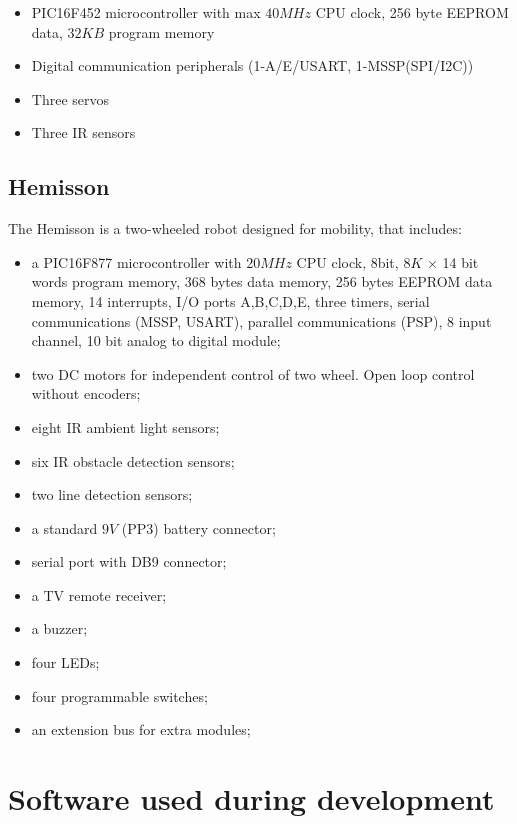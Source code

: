 \documentclass[a4paper,10pt]{article} %
\begin{document}
\begin{itemize}
    \item PIC16F452 microcontroller with max $40MHz$ CPU clock, 256 byte
    EEPROM data, $32KB$ program memory
    \item Digital communication peripherals (1-A/E/USART, 1-MSSP(SPI/I2C))
    \item Three servos
    \item Three IR sensors
\end{itemize}


\subsection{Hemisson} %
\label{sub:Hemisson}

The Hemisson is a two-wheeled robot designed for mobility, that includes:
\begin{itemize}
    \item a PIC16F877 microcontroller with $20MHz$ CPU clock, 8bit,
    $8K$ $\times$ 14 bit words program memory, 368 bytes data memory, 256 bytes
    EEPROM data memory, 14 interrupts, I/O ports A,B,C,D,E, three timers,
    serial communications (MSSP, USART), parallel communications (PSP), 8
    input channel, 10 bit analog to digital module;
    \item two DC motors for independent control of two wheel. Open loop
    control without encoders;
    \item eight IR ambient light sensors;
    \item six IR obstacle detection sensors;
    \item two line detection sensors;
    \item a standard $9V$ (PP3) battery connector;
    \item serial port with DB9 connector;
    \item a TV remote receiver;
    \item a buzzer;
    \item four LEDs;
    \item four programmable switches;
    \item an extension bus for extra modules;
\end{itemize}



\section{Software used during development} %
\label{app:robot-software}
\end{document}
